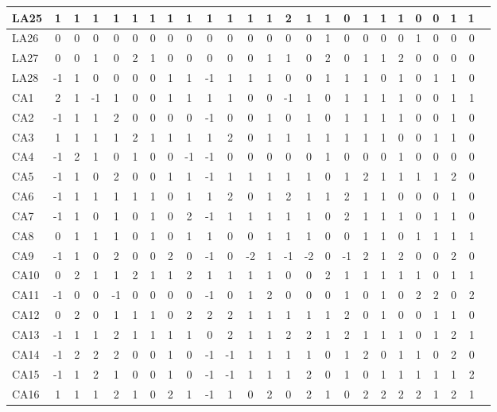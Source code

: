 \begin{table}[h!]
\begin{tabular}{|l|*{23}{c|}}
        LA25 & 1 & 1 & 1 & 1 & 1 & 1 & 1 & 1 & 1 & 1 & 1 & 1 & 2 & 1 & 1 & 0 & 1 & 1 & 1 & 0 & 0 & 1 & 1 ~\\ \hline
        LA26 & 0 & 0 & 0 & 0 & 0 & 0 & 0 & 0 & 0 & 0 & 0 & 0 & 0 & 0 & 1 & 0 & 0 & 0 & 0 & 1 & 0 & 0 & 0 ~\\ \hline
        LA27 & 0 & 0 & 1 & 0 & 2 & 1 & 0 & 0 & 0 & 0 & 0 & 1 & 1 & 0 & 2 & 0 & 1 & 1 & 2 & 0 & 0 & 0 & 0 ~\\ \hline
        LA28 & -1 & 1 & 0 & 0 & 0 & 0 & 1 & 1 & -1 & 1 & 1 & 1 & 0 & 0 & 1 & 1 & 1 & 0 & 1 & 0 & 1 & 1 & 0 ~\\ \hline
        CA1 & 2 & 1 & -1 & 1 & 0 & 0 & 1 & 1 & 1 & 1 & 0 & 0 & -1 & 1 & 0 & 1 & 1 & 1 & 1 & 0 & 0 & 1 & 1 ~\\ \hline
        CA2 & -1 & 1 & 1 & 2 & 0 & 0 & 0 & 0 & -1 & 0 & 0 & 1 & 0 & 1 & 0 & 1 & 1 & 1 & 1 & 0 & 0 & 1 & 0 ~\\ \hline
        CA3 & 1 & 1 & 1 & 1 & 2 & 1 & 1 & 1 & 1 & 2 & 0 & 1 & 1 & 1 & 1 & 1 & 1 & 1 & 0 & 0 & 1 & 1 & 0 ~\\ \hline
        CA4 & -1 & 2 & 1 & 0 & 1 & 0 & 0 & -1 & -1 & 0 & 0 & 0 & 0 & 0 & 1 & 0 & 0 & 0 & 1 & 0 & 0 & 0 & 0 ~\\ \hline
        CA5 & -1 & 1 & 0 & 2 & 0 & 0 & 1 & 1 & -1 & 1 & 1 & 1 & 1 & 1 & 0 & 1 & 2 & 1 & 1 & 1 & 1 & 2 & 0 ~\\ \hline
        CA6 & -1 & 1 & 1 & 1 & 1 & 1 & 0 & 1 & 1 & 2 & 0 & 1 & 2 & 1 & 1 & 2 & 1 & 1 & 0 & 0 & 0 & 1 & 0 ~\\ \hline
        CA7 & -1 & 1 & 0 & 1 & 0 & 1 & 0 & 2 & -1 & 1 & 1 & 1 & 1 & 1 & 0 & 2 & 1 & 1 & 1 & 0 & 1 & 1 & 0 ~\\ \hline
        CA8 & 0 & 1 & 1 & 1 & 0 & 1 & 0 & 1 & 1 & 0 & 0 & 1 & 1 & 1 & 0 & 0 & 1 & 1 & 0 & 1 & 1 & 1 & 1 ~\\ \hline
        CA9 & -1 & 1 & 0 & 2 & 0 & 0 & 2 & 0 & -1 & 0 & -2 & 1 & -1 & -2 & 0 & -1 & 2 & 1 & 2 & 0 & 0 & 2 & 0 ~\\ \hline
        CA10 & 0 & 2 & 1 & 1 & 2 & 1 & 1 & 2 & 1 & 1 & 1 & 1 & 0 & 0 & 2 & 1 & 1 & 1 & 1 & 1 & 0 & 1 & 1 ~\\ \hline
        CA11 & -1 & 0 & 0 & -1 & 0 & 0 & 0 & 0 & -1 & 0 & 1 & 2 & 0 & 0 & 0 & 1 & 0 & 1 & 0 & 2 & 2 & 0 & 2 ~\\ \hline
        CA12 & 0 & 2 & 0 & 1 & 1 & 1 & 0 & 2 & 2 & 2 & 1 & 1 & 1 & 1 & 1 & 2 & 0 & 1 & 0 & 0 & 1 & 1 & 0 ~\\ \hline
        CA13 & -1 & 1 & 1 & 2 & 1 & 1 & 1 & 1 & 0 & 2 & 1 & 1 & 2 & 2 & 1 & 2 & 1 & 1 & 1 & 0 & 1 & 2 & 1 ~\\ \hline
        CA14 & -1 & 2 & 2 & 2 & 0 & 0 & 1 & 0 & -1 & -1 & 1 & 1 & 1 & 1 & 0 & 1 & 2 & 0 & 1 & 1 & 0 & 2 & 0 ~\\ \hline
        CA15 & -1 & 1 & 2 & 1 & 0 & 0 & 1 & 0 & -1 & -1 & 1 & 1 & 1 & 2 & 0 & 1 & 0 & 1 & 1 & 1 & 1 & 1 & 2 ~\\ \hline
        CA16 & 1 & 1 & 1 & 2 & 1 & 0 & 2 & 1 & -1 & 1 & 0 & 2 & 0 & 2 & 1 & 0 & 2 & 2 & 2 & 2 & 1 & 2 & 1 ~\\ \hline
        

\end{tabular}
\end{table}
